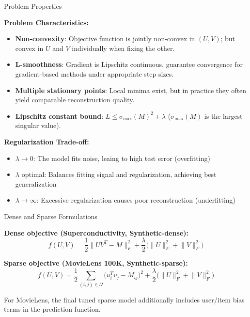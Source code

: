 \documentclass[aspectratio=169,usenames,dvipsnames]{beamer}
\begin{document}
\begin{frame}{Problem Properties}

\textbf{Problem Characteristics:}
\begin{itemize}
    \item \textbf{Non-convexity}: Objective function is jointly non-convex in $(U, V)$; but convex in $U$ and $V$ individually when fixing the other.
    \item \textbf{L-smoothness}: Gradient is Lipschitz continuous, guarantee convergence for gradient-based methods under appropriate step sizes.
    \item \textbf{Multiple stationary points}: Local minima exist, but in practice they often yield comparable reconstruction quality.
    \item \textbf{Lipschitz constant bound}: $L \leq \sigma_{\max}(M)^2 + \lambda$ ($\sigma_{\max}(M)$ is the largest singular value).
\end{itemize}

\vspace{0.25cm}

    \textbf{Regularization Trade-off:}
    \begin{itemize}
        \item $\lambda \to 0$: The model fits noise, leaing to high test error (overfitting)
        \item $\lambda$ optimal: Balances fitting signal and regularization, achieving best generalization 
        \item $\lambda \to \infty$: Excessive regularization causes poor reconstruction (underfitting)
    \end{itemize}
\end{frame}

\begin{frame}{Dense and Sparse Formulations}

\textbf{Dense objective (Superconductivity, Synthetic-dense):}
\[
f(U,V)
= \frac{1}{2}\lVert UV^T - M\rVert_F^2
+ \frac{\lambda}{2}\bigl(\lVert U\rVert_F^2 + \lVert V\rVert_F^2\bigr)
\]

\vspace{0.3cm}

\textbf{Sparse objective (MovieLens 100K, Synthetic-sparse):}
\[
f(U,V)
= \frac{1}{2}\sum_{(i,j)\in\Omega}\bigl(u_i^T v_j - M_{ij}\bigr)^2
+ \frac{\lambda}{2}\bigl(\lVert U\rVert_F^2 + \lVert V\rVert_F^2\bigr)
\]

\vspace{0.2cm}
\footnotesize
For MovieLens, the final tuned sparse model additionally includes user/item bias terms in the prediction function.

\end{frame}
\end{document}
